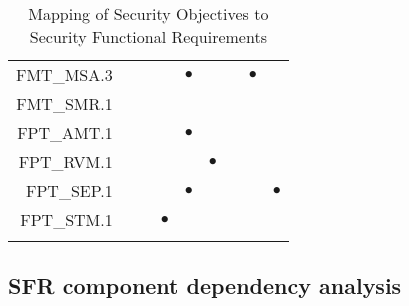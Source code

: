 \documentclass[12pt,english]{scrbook}
\newcommand{\oh}{$\bullet$}
\begin{document}
\begin{longtable}{rRRRRRRRR}
FMT\_MSA.3                  &      &              &         & \oh       &          &             &  \oh         &              \\
FMT\_SMR.1                  &      &              &         &           &          &             &              &              \\
FPT\_AMT.1                  &      &              &         & \oh       &          &             &              &              \\
FPT\_RVM.1                  &      &              &         &           &  \oh     &             &              &              \\
FPT\_SEP.1                  &      &              &         &   \oh     &          &             &              &   \oh        \\
FPT\_STM.1                  &      &              &  \oh    &           &          &             &              &              \\
 \bottomrule
 \caption{Mapping of Security Objectives to Security Functional Requirements}
\end{longtable}

\subsection{SFR component dependency analysis}
\end{document}
